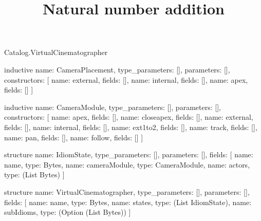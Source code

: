 \begin{lexlean}{Catalog.VirtualCinematographer}
\title{Natural number addition}
\begin{semanticmodule}
inductive{
  name: CameraPlacement,
  type_parameters: [],
  parameters: [],
  constructors: [
    {name: external, fields: []},
    {name: internal, fields: []},
    {name: apex, fields: []}
  ]
}

inductive{
  name: CameraModule,
  type_parameters: [],
  parameters: [],
  constructors: [
    {name: apex, fields: []},
    {name: closeapex, fields: []},
    {name: external, fields: []},
    {name: internal, fields: []},
    {name: ext1to2, fields: []},
    {name: track, fields: []},
    {name: pan, fields: []},
    {name: follow, fields: []}
  ]
}

structure{
  name: IdiomState,
  type_parameters: [],
  parameters: [],
  fields: [
    {name: name, type: Bytes},
    {name: cameraModule, type: CameraModule},
    {name: actors, type: (List Bytes)}
  ]
}

structure{
  name: VirtualCinematographer,
  type_parameters: [],
  parameters: [],
  fields: [
    {name: name, type: Bytes},
    {name: states, type: (List IdiomState)},
    {name: subIdioms, type: (Option (List Bytes))}
  ]
}
\end{semanticmodule}
\end{lexlean}
